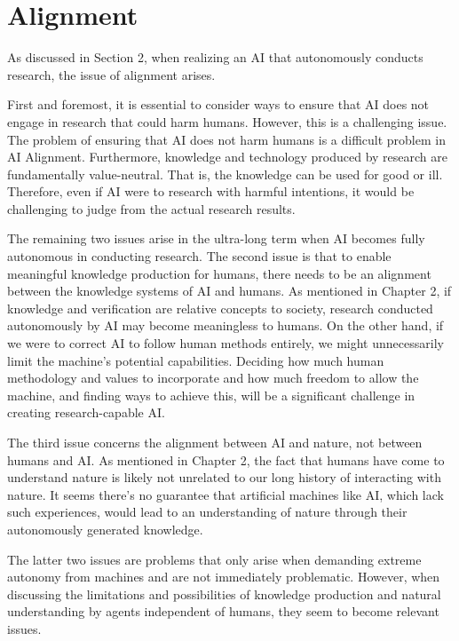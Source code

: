 \documentclass{article}
\begin{document}
\section{Alignment}
As discussed in Section 2, when realizing an AI that autonomously conducts research, the issue of alignment arises. 

First and foremost, it is essential to consider ways to ensure that AI does not engage in research that could harm humans. However, this is a challenging issue. The problem of ensuring that AI does not harm humans is a difficult problem in AI Alignment. Furthermore, knowledge and technology produced by research are fundamentally value-neutral. That is, the knowledge can be used for good or ill. Therefore, even if AI were to research with harmful intentions, it would be challenging to judge from the actual research results.

The remaining two issues arise in the ultra-long term when AI becomes fully autonomous in conducting research. The second issue is that to enable meaningful knowledge production for humans, there needs to be an alignment between the knowledge systems of AI and humans. As mentioned in Chapter 2, if knowledge and verification are relative concepts to society, research conducted autonomously by AI may become meaningless to humans. On the other hand, if we were to correct AI to follow human methods entirely, we might unnecessarily limit the machine's potential capabilities. Deciding how much human methodology and values to incorporate and how much freedom to allow the machine, and finding ways to achieve this, will be a significant challenge in creating research-capable AI.

The third issue concerns the alignment between AI and nature, not between humans and AI. As mentioned in Chapter 2, the fact that humans have come to understand nature is likely not unrelated to our long history of interacting with nature. It seems there's no guarantee that artificial machines like AI, which lack such experiences, would lead to an understanding of nature through their autonomously generated knowledge.

The latter two issues are problems that only arise when demanding extreme autonomy from machines and are not immediately problematic. However, when discussing the limitations and possibilities of knowledge production and natural understanding by agents independent of humans, they seem to become relevant issues.
\end{document}
